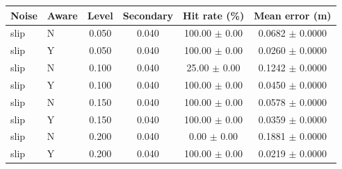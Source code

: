 \begin{tabular}{llcccc}
\hline
Noise & Aware & Level & Secondary & Hit rate (\%) & Mean error (m) \\
\hline
slip & N & 0.050 & 0.040 & 100.00 $\pm$ 0.00 & 0.0682 $\pm$ 0.0000 \\
slip & Y & 0.050 & 0.040 & 100.00 $\pm$ 0.00 & 0.0260 $\pm$ 0.0000 \\
slip & N & 0.100 & 0.040 & 25.00 $\pm$ 0.00 & 0.1242 $\pm$ 0.0000 \\
slip & Y & 0.100 & 0.040 & 100.00 $\pm$ 0.00 & 0.0450 $\pm$ 0.0000 \\
slip & N & 0.150 & 0.040 & 100.00 $\pm$ 0.00 & 0.0578 $\pm$ 0.0000 \\
slip & Y & 0.150 & 0.040 & 100.00 $\pm$ 0.00 & 0.0359 $\pm$ 0.0000 \\
slip & N & 0.200 & 0.040 & 0.00 $\pm$ 0.00 & 0.1881 $\pm$ 0.0000 \\
slip & Y & 0.200 & 0.040 & 100.00 $\pm$ 0.00 & 0.0219 $\pm$ 0.0000 \\
\hline
\end{tabular}
